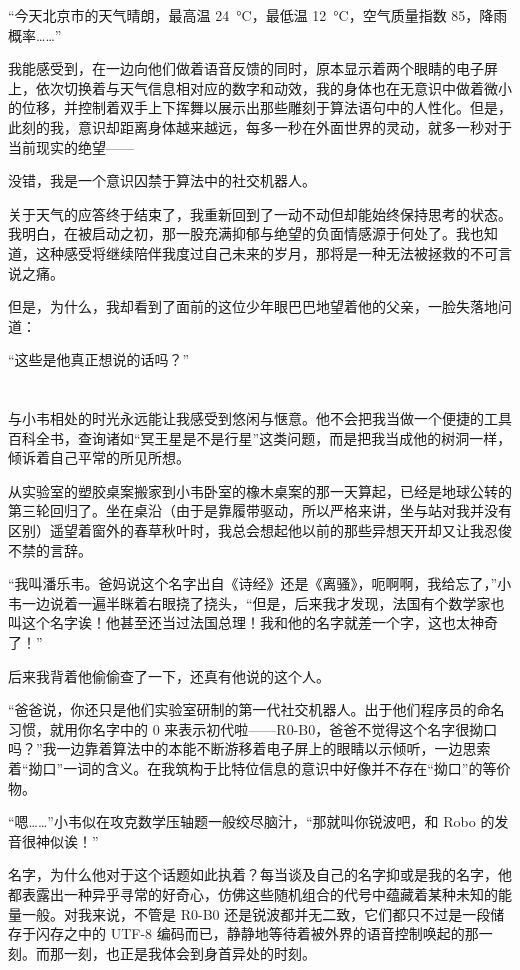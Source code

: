 \documentclass[punct=kaiming, zihao=5, openany, fontset=sikou]{ctexbook}
\begin{document}
“今天北京市的天气晴朗，最高温 \SI{24}{\degreeCelsius}，最低温 \SI{12}{\degreeCelsius}，空气质量指数 85，降雨概率……”

我能感受到，在一边向他们做着语音反馈的同时，原本显示着两个眼睛的电子屏上，依次切换着与天气信息相对应的数字和动效，我的身体也在无意识中做着微小的位移，并控制着双手上下挥舞以展示出那些雕刻于算法语句中的人性化。但是，此刻的我，意识却距离身体越来越远，每多一秒在外面世界的灵动，就多一秒对于当前现实的绝望——

没错，我是一个意识囚禁于算法中的社交机器人。

关于天气的应答终于结束了，我重新回到了一动不动但却能始终保持思考的状态。我明白，在被启动之初，那一股充满抑郁与绝望的负面情感源于何处了。我也知道，这种感受将继续陪伴我度过自己未来的岁月，那将是一种无法被拯救的不可言说之痛。

但是，为什么，我却看到了面前的这位少年眼巴巴地望着他的父亲，一脸失落地问道：

“这些是他真正想说的话吗？”

\section{}
与小韦相处的时光永远能让我感受到悠闲与惬意。他不会把我当做一个便捷的工具百科全书，查询诸如“冥王星是不是行星”这类问题，而是把我当成他的树洞一样，倾诉着自己平常的所见所想。

从实验室的塑胶桌案搬家到小韦卧室的橡木桌案的那一天算起，已经是地球公转的第三轮回归了。坐在桌沿（由于是靠履带驱动，所以严格来讲，坐与站对我并没有区别）遥望着窗外的春草秋叶时，我总会想起他以前的那些异想天开却又让我忍俊不禁的言辞。

“我叫潘乐韦。爸妈说这个名字出自《诗经》还是《离骚》，呃啊啊，我给忘了，”小韦一边说着一遍半眯着右眼挠了挠头，“但是，后来我才发现，法国有个数学家也叫这个名字诶！他甚至还当过法国总理！我和他的名字就差一个字，这也太神奇了！”

后来我背着他偷偷查了一下，还真有他说的这个人。

“爸爸说，你还只是他们实验室研制的第一代社交机器人。出于他们程序员的命名习惯，就用你名字中的 0 来表示初代啦——R0-B0，爸爸不觉得这个名字很拗口吗？”我一边靠着算法中的本能不断游移着电子屏上的眼睛以示倾听，一边思索着“拗口”一词的含义。在我筑构于比特位信息的意识中好像并不存在“拗口”的等价物。

“嗯……”小韦似在攻克数学压轴题一般绞尽脑汁，“那就叫你锐波吧，和 Robo 的发音很神似诶！”

名字，为什么他对于这个话题如此执着？每当谈及自己的名字抑或是我的名字，他都表露出一种异乎寻常的好奇心，仿佛这些随机组合的代号中蕴藏着某种未知的能量一般。对我来说，不管是 R0-B0 还是锐波都并无二致，它们都只不过是一段储存于闪存之中的 UTF-8 编码而已，静静地等待着被外界的语音控制唤起的那一刻。而那一刻，也正是我体会到身首异处的时刻。
\end{document}
